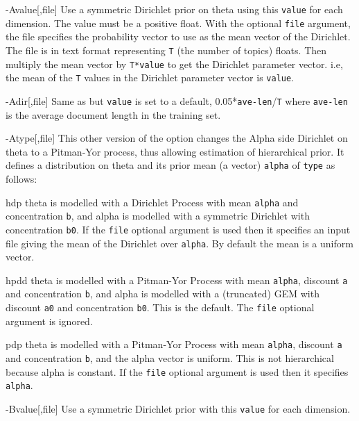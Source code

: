 \documentclass[a4paper,english]{article}
\begin{document}
\begin{Description}\setlength{\itemsep}{0cm}
\item[{-A}{value[,file]}]  Use a symmetric Dirichlet prior on theta
using this \texttt{value} for each dimension.  The value must be a positive float.  With the optional \texttt{file} argument, the file
specifies the probability vector to use as the mean vector of the
Dirichlet. The file is in text format representing  \texttt{T} 
(the number of topics) floats.
Then multiply the mean vector by \texttt{T*value} 
to get the Dirichlet parameter vector.
i.e, the mean of the \texttt{T} values 
in the Dirichlet parameter vector is \texttt{value}.
\item[{-A}{dir[,file]}]  Same as  but
\texttt{value} is set to a default,
0.05*\texttt{ave-len}/\texttt{T} where
\texttt{ave-len} is the average document length in the training set.
\item[{-A}{type[,file]}]  This other version of the
 option  changes the Alpha side 
Dirichlet on theta to a Pitman-Yor process, thus
allowing estimation of hierarchical prior.
It defines a distribution on theta and its prior mean (a vector) 
 \texttt{alpha} of \texttt{type} as follows:
\begin{Description}[hpdd]
\item[hdp] 
theta is modelled with a Dirichlet Process 
with mean \texttt{alpha} and concentration \texttt{b},
and alpha is modelled with a symmetric Dirichlet with concentration
\texttt{b0}.
If the \texttt{file} optional argument is used
then it specifies an input file giving the
mean of the Dirichlet over \texttt{alpha}.
By default the mean is a uniform vector.
\item[hpdd] theta is modelled with a Pitman-Yor Process
with mean \texttt{alpha}, discount \texttt{a} and concentration \texttt{b},
and alpha is modelled with a (truncated) GEM 
with discount \texttt{a0} and concentration \texttt{b0}.
This is the default.
The \texttt{file} optional argument is ignored.
\item[pdp] theta is modelled with a Pitman-Yor Process
with mean \texttt{alpha}, discount \texttt{a} and concentration \texttt{b},
and the alpha vector is uniform.
This is not hierarchical because alpha is constant.
If the \texttt{file} optional argument is used
then it specifies \texttt{alpha}.
\end{Description}
\item[{-B}{value[,file]}]  Use a symmetric Dirichlet prior with
this \texttt{value} for each dimension.

\end{Description}
\end{document}
